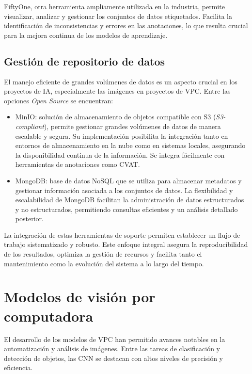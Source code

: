 FiftyOne, otra herramienta ampliamente utilizada en la industria, permite visualizar, analizar y gestionar los conjuntos de datos etiquetados. Facilita la identificación de inconsistencias y errores en las anotaciones, lo que resulta crucial para la mejora continua de los modelos de aprendizaje.

\subsection{Gestión de repositorio de datos}

El manejo eficiente de grandes volúmenes de datos es un aspecto crucial en los proyectos de IA, especialmente las imágenes en proyectos de VPC. Entre las opciones \textit{Open Source} se encuentran:

\begin{itemize}
	\item MinIO: solución de almacenamiento de objetos compatible con S3 (\textit{S3-compliant}), permite gestionar grandes volúmenes de datos de manera escalable y segura. Su implementación posibilita la integración tanto en entornos de almacenamiento en la nube como en sistemas locales, asegurando la disponibilidad continua de la información. Se integra fácilmente con herramientas de anotaciones como CVAT.
	\item MongoDB: base de datos NoSQL que se utiliza para almacenar metadatos y gestionar información asociada a los conjuntos de datos. La flexibilidad y escalabilidad de MongoDB facilitan la administración de datos estructurados y no estructurados, permitiendo consultas eficientes y un análisis detallado posterior.
\end{itemize}

La integración de estas herramientas de soporte permiten establecer un flujo de trabajo sistematizado y robusto. Este enfoque integral asegura la reproducibilidad de los resultados, optimiza la gestión de recursos y facilita tanto el mantenimiento como la evolución del sistema a lo largo del tiempo.

\section{Modelos de visión por computadora} \label{sec:modelosVisPC}

El desarrollo de los modelos de VPC han permitido avances notables en la automatización y análisis de imágenes. Entre las tareas de clasificación y detección de objetos, las CNN se destacan con altos niveles de precisión y eficiencia.

